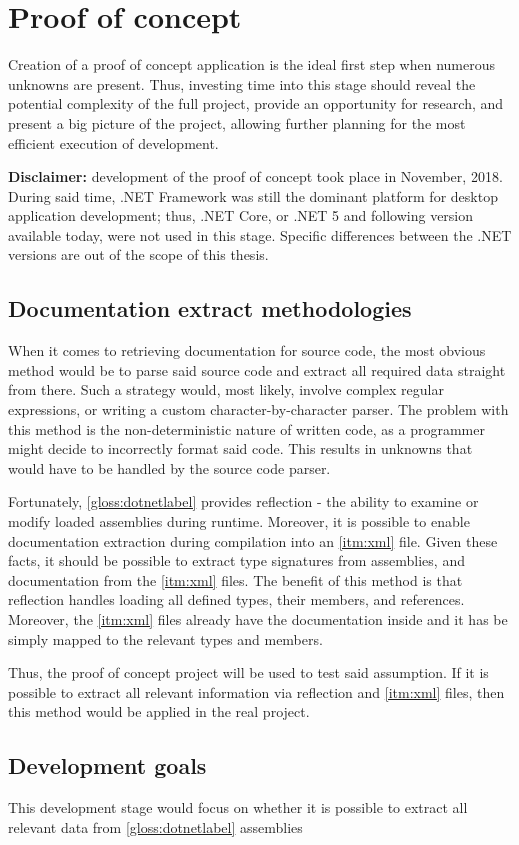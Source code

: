 \chapter{Proof of concept}

Creation of a proof of concept application is the ideal first step when numerous unknowns are present. Thus, investing time into this stage should reveal the potential complexity of the full project, provide an opportunity for research, and present a big picture of the project, allowing further planning for the most efficient execution of development.

\textbf{Disclaimer:}
development of the proof of concept took place in November, 2018. During said time, .NET Framework was still the dominant platform for desktop application development; thus, .NET Core, or .NET 5 and following version available today, were not used in this stage. Specific differences between the .NET versions are out of the scope of this thesis.

\section*{Documentation extract methodologies}
When it comes to retrieving documentation for source code, the most obvious method would be to parse said source code and extract all required data straight from there. Such a strategy would, most likely, involve complex regular expressions, or writing a custom character-by-character parser. The problem with this method is the non-deterministic nature of written code, as a programmer might decide to incorrectly format said code. This results in unknowns that would have to be handled by the source code parser.

Fortunately, \ref{gloss:dotnetlabel} provides reflection - the ability to examine or modify loaded assemblies during runtime. Moreover, it is possible to enable documentation extraction during compilation into an \ref{itm:xml} file. Given these facts, it should be possible to extract type signatures from assemblies, and documentation from the \ref{itm:xml} files. The benefit of this method is that reflection handles loading all defined types, their members, and references. Moreover, the \ref{itm:xml} files already have the documentation inside and it has be simply mapped to the relevant types and members.

Thus, the proof of concept project will be used to test said assumption. If it is possible to extract all relevant information via reflection and \ref{itm:xml} files, then this method would be applied in the real project.

\section*{Development goals}
This development stage would focus on whether it is possible to extract all relevant data from \ref{gloss:dotnetlabel} assemblies